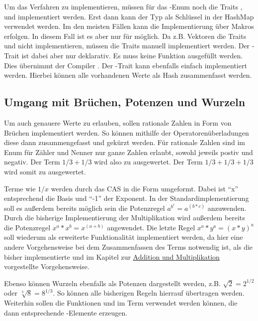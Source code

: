 \documentclass[11pt,a4paper, ngerman]{article}
\begin{document}
Um das Verfahren zu implementieren, müssen für das -Enum noch die Traits ,  und  implementiert werden. Erst dann kann der Typ  als Schlüssel in der HashMap verwendet werden. Im den meisten Fällen kann die Implementierung über Makros erfolgen. In diesem Fall ist es aber nur für  möglich. Da z.B. Vektoren die Traits  und  nicht implementieren, müssen die Traits manuell implementiert werden. Der -Trait ist dabei aber nur deklarativ. Es muss keine Funktion ausgefüllt werden. Dies übernimmt der Compiler \cite{RustEqTrait}. Der -Trait kann ebenfalls einfach implementiert werden. Hierbei können alle vorhandenen Werte als Hash zusammenfasst werden.

\subsection{Umgang mit Brüchen, Potenzen und Wurzeln}
Um auch genauere Werte zu erlauben, sollen rationale Zahlen in Form von Brüchen implementiert werden. So können mithilfe der Operatorenüberladungen diese dann zusammengefasst und gekürzt werden. Für rationale Zahlen sind im Enum  für Zähler und Nenner nur ganze Zahlen erlaubt, sowohl jeweils postiv und negativ. Der Term $1/3+1/3$ wird also zu  ausgewertet. Der Term $1/3+1/3+1/3$ wird somit zu  ausgewertet.

Terme wie $1/x$ werden durch das CAS in die Form  umgeformt. Dabei ist ``x'' entsprechend die Basis und ``-1'' der Exponent. In der Standardimplementierung soll es außerdem bereits möglich sein die Potenzregel $a^{b^{c}} = a^{(b*c)}$ anzuwenden. Durch die bisherige Implementierung der Multiplikation wird außerdem bereits die Potenzregel $x^a*x^b = x^{(a+b)}$ angewendet. Die letzte Regel $x^a*y^a = (x*y)^a$ soll wiederum als erweiterte Funktionalität implementiert werden, da hier eine andere Vorgehensweise bei dem Zusammenfassen des Terms notwendig ist, als die bisher implementierte und im Kapitel zur \hyperref[sec:kapAddnundMult]{Addition und Multiplikation} vorgestellte Vorgehensweise.

Ebenso können Wurzeln ebenfalls als Potenzen dargestellt werden, z.B. $\sqrt{2} = 2^{1/2}$ oder $\sqrt[3]{8} = 8^{1/3}$. So können alle bisherigen Regeln hierrauf übertragen werden. Weiterhin sollen die Funktionen  und  im Term verwendet werden können, die dann entsprechende -Elemente erzeugen.
\end{document}
